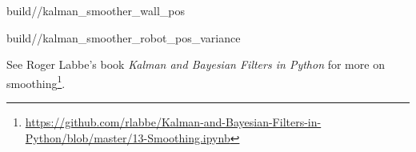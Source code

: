 \begin{svg}{build/\chapterpath/kalman_smoother_wall_pos}
  \caption{Wall position with Kalman smoother}
  \label{fig:smoother_wall_pos}
\end{svg}

\begin{svg}{build/\chapterpath/kalman_smoother_robot_pos_variance}
  \caption{Robot position variance with Kalman smoother}
  \label{fig:smoother_robot_pos_variance}
\end{svg}

See Roger Labbe's book \textit{Kalman and Bayesian Filters in Python} for more
on
smoothing\footnote{\url{https://github.com/rlabbe/Kalman-and-Bayesian-Filters-in-Python/blob/master/13-Smoothing.ipynb}}.
